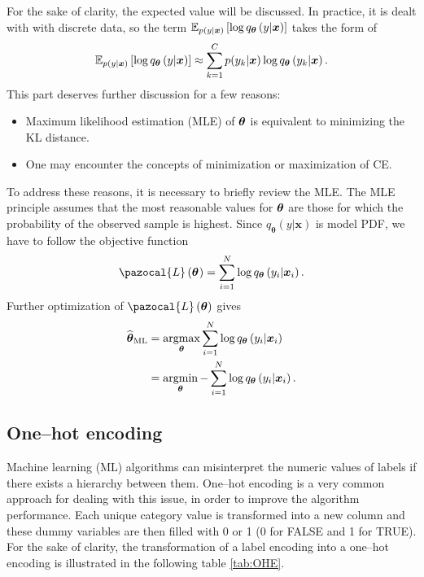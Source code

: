For the sake of clarity, the expected value will be discussed. In practice, it is dealt with with discrete data, so the term $\mathbb{E}_{ p(y| \boldsymbol{x})}\left[\log q_{\boldsymbol{\theta}}\left(y|\boldsymbol{x}\right)\right]$ takes the form of
\begin{equation}
    \mathbb{E}_{p(y| \boldsymbol{x})}\left[\log q_{\boldsymbol{\theta}}\left(y|\boldsymbol{x}\right)\right] \approx \sum_{k=1}^C p(y_k| \boldsymbol{x})\log q_{\boldsymbol{\theta}}\left(y_k|\boldsymbol{x}\right).
\end{equation}
This part deserves further discussion for a few reasons:
\begin{itemize}
    \item Maximum likelihood estimation (MLE) of $\boldsymbol{\theta}$ is equivalent to minimizing the KL distance.
    \item One may encounter the concepts of minimization or maximization of CE.
\end{itemize}
To address these reasons, it is necessary to briefly review the MLE. The MLE principle assumes that the most reasonable
values for $\boldsymbol{\theta}$ are those for which the probability of the observed sample is
highest. Since $q_{\boldsymbol{\theta}}\left(y|\boldsymbol{x}\right)$ is model PDF, we have to follow the objective function
\begin{equation}
   \pazocal{L}\left(\bt^{}\right)= \sum_{i=1}^{N}\log q_{\boldsymbol{\theta}}\left(y_i|\boldsymbol{x}_i\right).
\end{equation}
Further optimization of $\pazocal{L}\left(\bt\right)$ gives 
\begin{align}
    \widehat{\boldsymbol{\theta}}_{\mathrm{ML}} &= \mathop{\mathrm{argmax}}_{\boldsymbol{\theta}} \sum_{i=1}^{N}\log q_{\boldsymbol{\theta}}\left(y_i|\boldsymbol{x}_i\right)\\  
    &=\mathop{\mathrm{argmin}}_{\boldsymbol{\theta}} -\sum_{i=1}^{N}\log q_{\boldsymbol{\theta}}\left(y_i|\boldsymbol{x}_i\right).
\end{align}

\subsection{One--hot encoding}\label{OHE}
 Machine learning (ML) algorithms can misinterpret the numeric values of labels if there exists a hierarchy between them. One--hot encoding is a very common approach for dealing with this issue, in order to improve the algorithm performance. Each unique category value is transformed into a new column and these dummy variables are then filled with 0 or 1 (0 for FALSE and 1 for TRUE). For the sake of clarity, the transformation of a label encoding into a one--hot encoding is illustrated in the following table \ref{tab:OHE}. 
 
